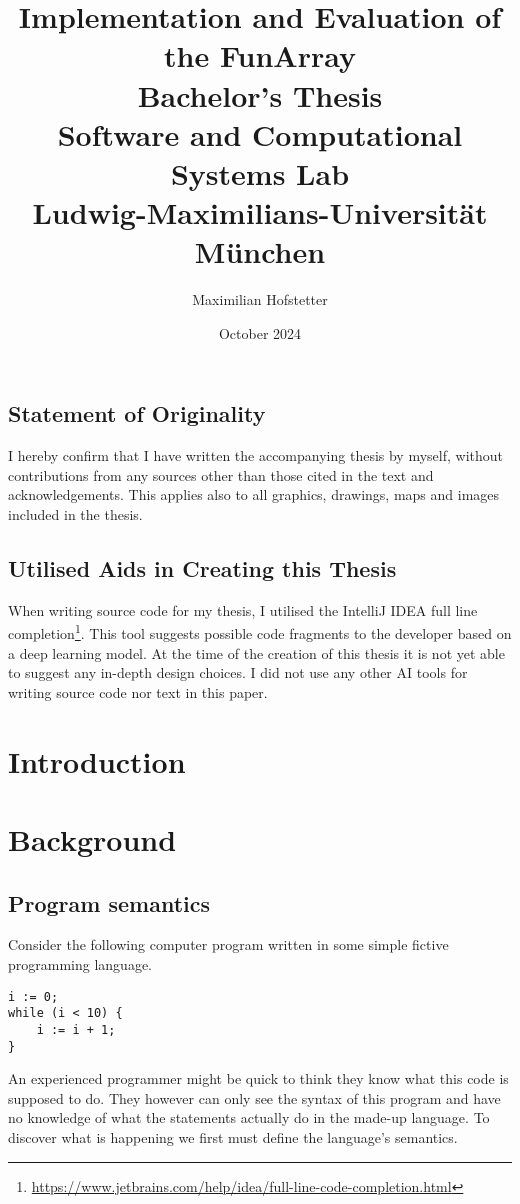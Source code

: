 \documentclass{report}
\title{Implementation and Evaluation of the FunArray\\[1em]\large{}Bachelor's Thesis\\[1em]Software and Computational Systems Lab\\Ludwig-Maximilians-Universit\"at M\"unchen}
\date{October 2024}
\author{Maximilian Hofstetter}
\begin{document}
\section*{Statement of Originality}
\thispagestyle{empty}
I hereby confirm that I have written the accompanying thesis by myself, without contributions from any sources other than those cited in the text and acknowledgements. This applies also to all graphics, drawings, maps and images included in the thesis.

\section*{Utilised Aids in Creating this Thesis}

When writing source code for my thesis, I utilised the IntelliJ IDEA full line completion\footnote{\url{https://www.jetbrains.com/help/idea/full-line-code-completion.html}}. This tool suggests possible code fragments to the developer based on a deep learning model. At the time of the creation of this thesis it is not yet able to suggest any in-depth design choices. I did not use any other AI tools for writing source code nor text in this paper.

\maketitle
\setcounter{tocdepth}{1}
\tableofcontents

\chapter{Introduction}
\chapter{Background}
\section{Program semantics}

Consider the following computer program written in some simple fictive programming language.

\begin{center}
\begin{BVerbatim}
i := 0;
while (i < 10) {
    i := i + 1;
}
\end{BVerbatim}
\end{center}

An experienced programmer might be quick to think they know what this code is supposed to do. They however can only see the syntax of this program and have no knowledge of what the statements actually do in the made-up language. To discover what is happening we first must define the language's semantics. 
\end{document}
